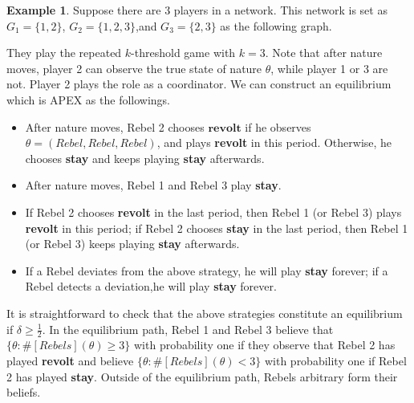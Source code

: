 \documentclass[12pt,letter]{article}
\theoremstyle{definition}
\newtheorem{example}{Example}[section]
\theoremstyle{remark}
\theoremstyle{claim}
\begin{document}
\begin{example}\label{ex_leading_ex}
Suppose there are 3 players in a network.  This network is set as $G_1=\{1,2\}$, $G_2=\{1,2,3\}$,and $G_3=\{2,3\}$ as the following graph.

\begin{center}
\end{center}

They play the repeated $k$-threshold game with $k=3$. Note that after nature moves, player 2 can observe the true state of nature $\theta$, while player 1 or 3 are not. Player 2 plays the role as a coordinator. We can construct an equilibrium which is APEX as the followings. 

\begin{itemize}
\item After nature moves, Rebel 2 chooses $\textbf{revolt}$ if he observes $\theta=(Rebel,Rebel,Rebel)$, and plays \textbf{revolt} in this period. Otherwise, he chooses \textbf{stay} and keeps playing \textbf{stay} afterwards. 
\item After nature moves, Rebel 1 and Rebel 3 play \textbf{stay}.
\item If Rebel 2 chooses \textbf{revolt} in the last period, then Rebel 1 (or Rebel 3) plays \textbf{revolt} in this period; if Rebel 2 chooses \textbf{stay} in the last period, then Rebel 1 (or Rebel 3) keeps playing \textbf{stay} afterwards. 
\item If a Rebel deviates from the above strategy, he will play \textbf{stay} forever; if a Rebel detects a deviation,he will play \textbf{stay} forever.
\end{itemize}

It is straightforward to check that the above strategies constitute an equilibrium if $\delta\geq \frac{1}{2}$. In the equilibrium path, Rebel 1 and Rebel 3 believe that $\{\theta:\#[Rebels](\theta)\geq 3\}$ with probability one if they observe that Rebel 2 has played \textbf{revolt} and believe $\{\theta:\#[Rebels](\theta)< 3\}$ with probability one if Rebel 2 has played \textbf{stay}. Outside of the equilibrium path, Rebels arbitrary form their beliefs.
\end{example}
\end{document}

